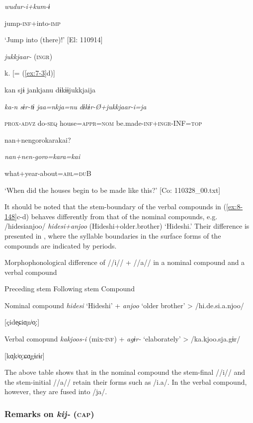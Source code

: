       \textit{wudur-i+kum{}-ɨ}

      jump-\textsc{inf}+into-\textsc{imp}

\glt ‘Jump into (there)!’ [El: 110914]

  \textit{jukkjaar-} (\textsc{ingr})

  k.  [= (\ref{ex:7-3}d)]

    {\TM}
\glll  kan  sjɨ  jankjanu  dɨkɨɨjukkjaija

      \textit{ka-n}  \textit{sɨr-tɨ}  \textit{jaa=nkja=nu}  \textit{dɨkɨr-Ø+jukkjaar{}-i=ja}

      \textsc{prox}-\textsc{advz}  do-\textsc{seq}  house=\textsc{appr}=\textsc{nom}  be.made-\textsc{inf}+\textsc{ingr}-INF=\textsc{top}

      {\textbar}nan+nengoro{\textbar}karakai?

      \textit{nan+nen-goro=kara=kai}

      what+year-about=\textsc{abl}=\textsc{du}B

\glt ‘When did the houses begin to be made like this?’ [Co: 110328\_00.txt]
\z

It should be noted that the stem-boundary of the verbal compounds in (\ref{ex:8-148}c-d) behaves differently from that of the nominal compounds, e.g. /hidesianjoo/ \textit{hidesi+anjoo} (Hideshi+older.brother) ‘Hideshi.’ Their difference is presented in , where the syllable boundaries in the surface forms of the compounds are indicated by periods.

\begin{table}
\caption{\label{tab:key:88}Morphophonological difference of //i// + //a// in a nominal compound and a verbal compound}
  Preceding stem    Following stem    Compound

Nominal compound  \textit{hidesi}  ‘Hideshi’  +  \textit{anjoo}  ‘older brother’  >  /hi.de.si.a.njoo/

[çide̞ɕiɑ̞nʲo̞ː]

Verbal comopund  \textit{kakjoos-i}  (mix-\textsc{inf})  +  \textit{agɨr-}  ‘elaborately’  >  /ka.kjoo.sja.gɨr/

[kɑ̞kʲo̞ːɕɑ̞gɨɾɨɾ]
\end{table}


The above table shows that in the nominal compound the stem-final //i// and the stem-initial //a// retain their forms such as /i.a/. In the verbal compound, however, they are fused into /ja/.

\subsubsection{Remarks on \textit{kij-} (\textsc{cap})}

